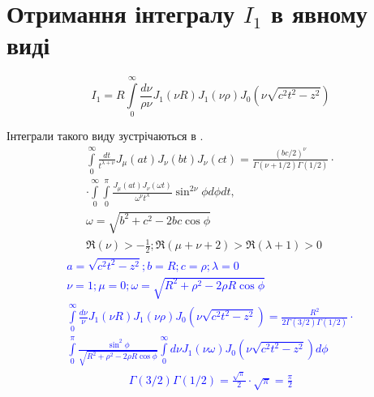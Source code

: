 \section{Отримання інтегралу $ I_1 $ в явному виді} \label{sec:i1anal}
%
\begin{equation} \label{eq:int1start}
I_1 = R \int\limits_{0}^{\infty} \frac{d\nu}{\rho \nu} 
J_1 \left( \nu R \right) J_1 \left( \nu \rho \right) 
J_0 \left( \nu \sqrt{c^2 t^2 - z^2} \right)
\end{equation}

Інтеграли такого виду зустрічаються в \cite[ст. 398]{imp:Watson1922}.
\begin{equation} \begin{aligned} \label{eq:intJJJtable}
\int\limits_{0}^{\infty} \frac{d t}{t^{\lambda + \nu}} 
J_\mu \left( at \right) J_\nu \left( bt \right) J_\nu \left( ct \right) =
\frac{ \left( bc/2 \right) ^\nu }
{ \Gamma \left( \nu + 1/2 \right) \Gamma \left( 1/2 \right) } \cdot \\
\cdot \int\limits_{0}^{\infty} \int\limits_{0}^{\pi}
\frac{J_\mu \left( at \right) J_\nu \left( \omega t \right)}
{\omega^\nu t^\lambda} \sin^{2\nu}{\phi} d\phi dt, \\
\omega = \sqrt{b^2 + c^2 - 2bc \cos \phi} \\
\Re \left( \nu \right) > - \frac{1}{2};
\Re \left( \mu + \nu + 2 \right) > \Re \left( \lambda + 1 \right) > 0
\end{aligned} \end{equation}
%
\textcolor{blue}{ \begin{equation*} \begin{aligned}
a = \sqrt{c^2 t^2 - z^2}; b = R; c = \rho; \lambda = 0 \\
\nu = 1; \mu = 0; \omega = \sqrt{R^2 + \rho^2 - 2 \rho R \cos \phi} \\
\int\limits_{0}^{\infty} \frac{d\nu}{\nu} 
J_1 \left( \nu R \right) J_1 \left( \nu \rho \right) 
J_0 \left( \nu \sqrt{c^2 t^2 - z^2} \right) = 
\frac{R^2}{ 2 \Gamma \left( 3/2 \right) \Gamma \left( 1/2 \right) } \cdot \\
\int\limits_{0}^{\pi} 
\frac{\sin^2{\phi}}{\sqrt{R^2 + \rho^2 - 2 \rho R \cos \phi}}
\int\limits_{0}^{\infty} d \nu J_1 \left( \nu \omega \right) 
J_0 \left( \nu \sqrt{c^2 t^2 - z^2} \right) d \phi
\end{aligned} \end{equation*} }
%
\textcolor{blue}{ \begin{equation*} \begin{aligned}
\Gamma \left( 3/2 \right) \Gamma \left( 1/2 \right) = 
\frac{\sqrt{\pi}}{2} \cdot \sqrt{\pi} = \frac{\pi}{2} 
\end{aligned} \end{equation*} }
